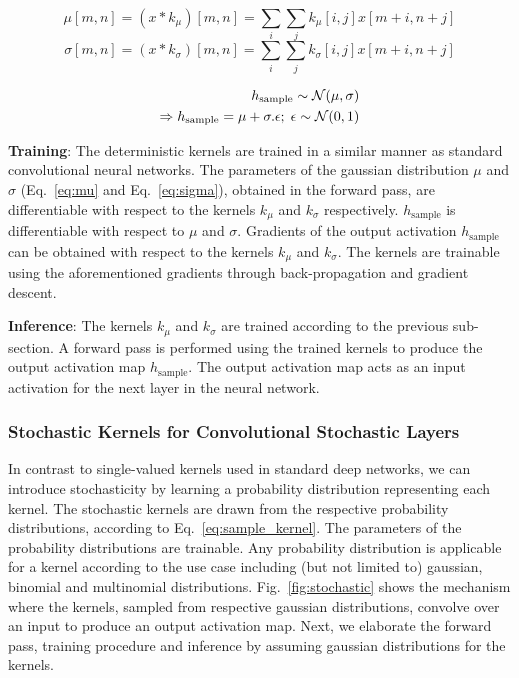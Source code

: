 \documentclass[12pt, letterpaper]{article}
\begin{document}
\begin{equation}
  \mu[m,n]=(x * k_\mu)[m,n]=\sum_i \sum_j k_\mu[i,j]x[m+i,n+j]
  \label{eq:mu}
\end{equation}
\begin{equation}
  \sigma[m,n]=(x * k_\sigma)[m,n]=\sum_i \sum_j k_\sigma[i,j]x[m+i,n+j]
  \label{eq:sigma}
\end{equation}

\begin{align}
  h_\mathrm{sample} \sim \mathcal{N}(\mu,\sigma) \notag\\
  \Rightarrow h_\mathrm{sample}=\mu + \sigma.\epsilon;\; \epsilon \sim \mathcal{N}(0,1)
  \label{eq:sample}
\end{align}

\textbf{Training}: The deterministic kernels are trained in a similar manner as standard convolutional neural networks. The parameters of the gaussian distribution $\mu$ and $\sigma$ (Eq.~\eqref{eq:mu} and Eq.~\eqref{eq:sigma}), obtained in the forward pass, are differentiable with respect to the kernels $k_\mu$ and $k_\sigma$ respectively. $h_\mathrm{sample}$ is differentiable with respect to $\mu$ and $\sigma$. Gradients of the output activation $h_\mathrm{sample}$ can be obtained with respect to the kernels  $k_\mu$ and $k_\sigma$. The kernels are trainable using the aforementioned gradients through back-propagation and gradient descent. 

\textbf{Inference}:
The kernels $k_\mu$ and $k_\sigma$ are trained according to the previous sub-section. A forward pass is performed using the trained kernels to produce the output activation map $h_\mathrm{sample}$. The output activation map acts as an input activation for the next layer in the neural network. %

\subsubsection{Stochastic Kernels for Convolutional Stochastic Layers} 
In contrast to single-valued kernels used in standard deep networks, we can introduce stochasticity by learning a probability distribution representing each kernel. The stochastic kernels are drawn from the respective probability distributions, according to Eq.~\eqref{eq:sample_kernel}. The parameters of the probability distributions are trainable. 
Any probability distribution is applicable for a kernel according to the use case including (but not limited to) gaussian, binomial and multinomial distributions.  
Fig.~\ref{fig:stochastic} shows the mechanism where the kernels, sampled from respective gaussian distributions,  convolve over an input to produce an output activation map. 
Next, we elaborate the forward pass, training procedure and inference by assuming gaussian distributions for the kernels. 
\end{document}
